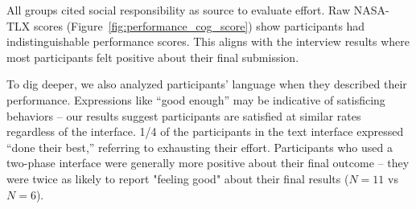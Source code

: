 All groups cited social responsibility as source to evaluate effort. Raw NASA-TLX scores (Figure~\ref{fig:performance_cog_score}) show participants had indistinguishable performance scores. This aligns with the interview results where most participants felt positive about their final submission. 

To dig deeper, we also analyzed participants' language when they described their performance. Expressions like ``good enough'' may be indicative of satisficing behaviors -- our results suggest participants are satisfied at similar rates regardless of the interface. 1/4 of the participants in the text interface expressed ``done their best,'' referring to exhausting their effort. Participants who used a two-phase interface were generally more positive about their final outcome -- they were twice as likely to report "feeling good" about their final results ($N=11$ vs $N=6$).





